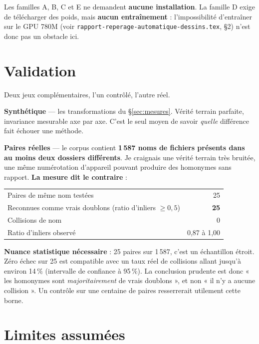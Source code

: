 \documentclass[11pt,a4paper]{article}
\newcommand{\alerte}[1]{\textcolor{alerte}{\textbf{#1}}}
\newcommand{\bon}[1]{\textcolor{vert}{\textbf{#1}}}
\begin{document}
Les familles A, B, C et E ne demandent \textbf{aucune installation}. La
famille D exige de télécharger des poids, mais \textbf{aucun entraînement} :
l'impossibilité d'entraîner sur le GPU 780M (voir
\texttt{rapport-reperage-automatique-dessins.tex}, §2) n'est donc pas un
obstacle ici.

\section{Validation}
\label{sec:validation}

Deux jeux complémentaires, l'un contrôlé, l'autre réel.

\textbf{Synthétique} — les transformations du §\ref{sec:mesures}. Vérité terrain
parfaite, invariance mesurable axe par axe. C'est le seul moyen de savoir
\emph{quelle} différence fait échouer une méthode.

\textbf{Paires réelles} — le corpus contient \textbf{1\,587 noms de fichiers
présents dans au moins deux dossiers différents}. Je craignais une vérité
terrain très bruitée, une même numérotation d'appareil pouvant produire des
homonymes sans rapport. \textbf{La mesure dit le contraire} :

\begin{table}[h]
\centering\small
\begin{tabular}{lr}
\toprule
Paires de même nom testées & 25 \\
Reconnues comme vrais doublons (ratio d'inliers $\geq0{,}5$) & \bon{25} \\
Collisions de nom & 0 \\
Ratio d'inliers observé & 0,87 à 1,00 \\
\bottomrule
\end{tabular}
\end{table}

\alerte{Nuance statistique nécessaire} : 25 paires sur 1\,587, c'est un
échantillon étroit. Zéro échec sur 25 est compatible avec un taux réel de
collisions allant jusqu'à environ 14\,\% (intervalle de confiance à 95\,\%). La
conclusion prudente est donc « les homonymes sont \emph{majoritairement} de
vrais doublons », et non « il n'y a aucune collision ». Un contrôle sur une
centaine de paires resserrerait utilement cette borne.

\section{Limites assumées}
\end{document}
